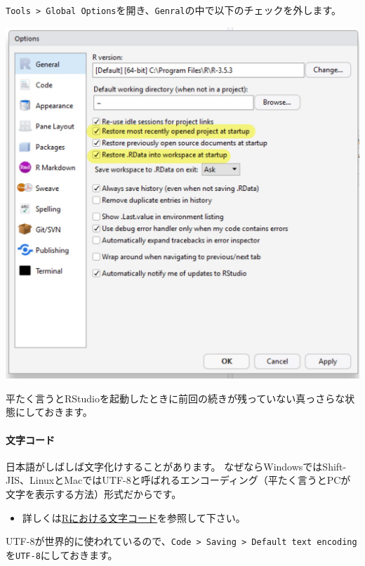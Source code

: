 \documentclass[]{bxjsreport}
\providecommand{\tightlist}{%
  \setlength{\itemsep}{0pt}\setlength{\parskip}{0pt}}
\let\oldparagraph\paragraph
\renewcommand{\paragraph}[1]{\oldparagraph{#1}\mbox{}}
\begin{document}
\texttt{Tools\ \textgreater{}\ Global\ Options}を開き、\texttt{Genral}の中で以下のチェックを外します。

\includegraphics{figures/Rstudio4.jpg}

平たく言うとRStudioを起動したときに前回の続きが残っていない真っさらな状態にしておきます。

\hypertarget{ux6587ux5b57ux30b3ux30fcux30c9}{%
\paragraph{文字コード}\label{ux6587ux5b57ux30b3ux30fcux30c9}}

日本語がしばしば文字化けすることがあります。
なぜならWindowsではShift-JIS、LinuxとMacではUTF-8と呼ばれるエンコーディング（平たく言うとPCが文字を表示する方法）形式だからです。

\begin{itemize}
\tightlist
\item
  詳しくは\href{encoding-r.html}{Rにおける文字コード}を参照して下さい。
\end{itemize}

UTF-8が世界的に使われているので、\texttt{Code\ \textgreater{}\ Saving\ \textgreater{}\ Default\ text\ encoding}を\texttt{UTF-8}にしておきます。
\end{document}
